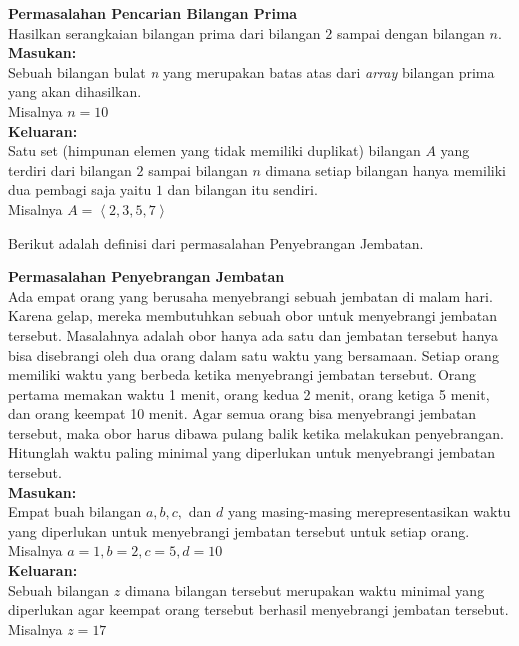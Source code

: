 \begin{contoh}
\label{cth:prima}
\textbf{Permasalahan Pencarian Bilangan Prima}\\
Hasilkan serangkaian bilangan prima dari bilangan $2$ sampai dengan bilangan $n$.\\  
\textbf{Masukan:}\\
Sebuah bilangan bulat \textit{n} yang merupakan batas atas dari \textit{array} bilangan prima yang akan dihasilkan.\\
Misalnya $n = 10$\\
\textbf{Keluaran:}\\
Satu set (himpunan elemen yang tidak memiliki duplikat) bilangan $A$ yang terdiri dari bilangan $2$ sampai bilangan $n$ dimana setiap bilangan hanya memiliki dua pembagi saja yaitu $1$ dan bilangan itu sendiri.\\
Misalnya $A = \left\langle 2,3,5,7 \right\rangle$\\
\end{contoh}
Berikut adalah definisi dari permasalahan Penyebrangan Jembatan.
\begin{contoh}
\textbf{Permasalahan Penyebrangan Jembatan}\\
Ada empat orang yang berusaha menyebrangi sebuah jembatan di malam hari. Karena gelap, mereka membutuhkan sebuah obor untuk menyebrangi jembatan tersebut. Masalahnya adalah obor hanya ada satu dan jembatan tersebut hanya bisa disebrangi oleh dua orang dalam satu waktu yang bersamaan. Setiap orang memiliki waktu yang berbeda ketika menyebrangi jembatan tersebut. Orang pertama memakan waktu 1 menit, orang kedua 2 menit, orang ketiga 5 menit, dan orang keempat 10 menit. 
Agar semua orang bisa menyebrangi jembatan tersebut, maka obor harus dibawa pulang balik ketika melakukan penyebrangan. Hitunglah waktu paling minimal yang diperlukan untuk menyebrangi jembatan tersebut.\\
\textbf{Masukan:}\\
Empat buah bilangan $a,b,c,$ dan $d$ yang masing-masing merepresentasikan waktu yang diperlukan untuk menyebrangi jembatan tersebut untuk setiap orang.\\
Misalnya $a = 1, b = 2, c = 5, d = 10$\\
\textbf{Keluaran:}\\
Sebuah bilangan $z$ dimana bilangan tersebut merupakan waktu minimal yang diperlukan agar keempat orang tersebut berhasil menyebrangi jembatan tersebut.\\
Misalnya $z = 17$\\
\end{contoh}

